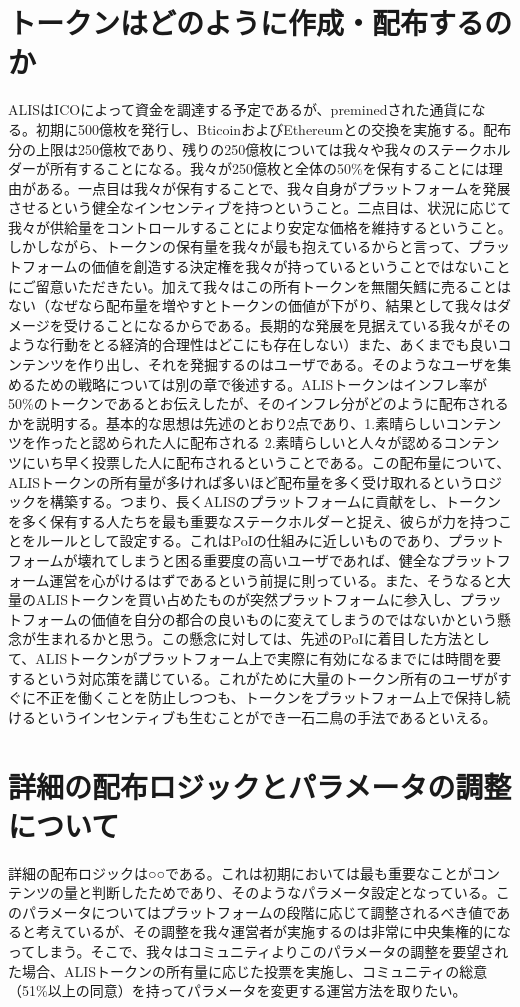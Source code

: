\documentclass{jsarticle}
\begin{document}
\section{トークンはどのように作成・配布するのか}
ALISはICOによって資金を調達する予定であるが、preminedされた通貨になる。初期に500億枚を発行し、BticoinおよびEthereumとの交換を実施する。配布分の上限は250億枚であり、残りの250億枚については我々や我々のステークホルダーが所有することになる。我々が250億枚と全体の50\%を保有することには理由がある。一点目は我々が保有することで、我々自身がプラットフォームを発展させるという健全なインセンティブを持つということ。二点目は、状況に応じて我々が供給量をコントロールすることにより安定な価格を維持するということ。しかしながら、トークンの保有量を我々が最も抱えているからと言って、プラットフォームの価値を創造する決定権を我々が持っているということではないことにご留意いただきたい。加えて我々はこの所有トークンを無闇矢鱈に売ることはない（なぜなら配布量を増やすとトークンの価値が下がり、結果として我々はダメージを受けることになるからである。長期的な発展を見据えている我々がそのような行動をとる経済的合理性はどこにも存在しない）また、あくまでも良いコンテンツを作り出し、それを発掘するのはユーザである。そのようなユーザを集めるための戦略については別の章で後述する。ALISトークンはインフレ率が50\%のトークンであるとお伝えしたが、そのインフレ分がどのように配布されるかを説明する。基本的な思想は先述のとおり2点であり、1.素晴らしいコンテンツを作ったと認められた人に配布される 2.素晴らしいと人々が認めるコンテンツにいち早く投票した人に配布されるということである。この配布量について、ALISトークンの所有量が多ければ多いほど配布量を多く受け取れるというロジックを構築する。つまり、長くALISのプラットフォームに貢献をし、トークンを多く保有する人たちを最も重要なステークホルダーと捉え、彼らが力を持つことをルールとして設定する。これはPoIの仕組みに近しいものであり、プラットフォームが壊れてしまうと困る重要度の高いユーザであれば、健全なプラットフォーム運営を心がけるはずであるという前提に則っている。また、そうなると大量のALISトークンを買い占めたものが突然プラットフォームに参入し、プラットフォームの価値を自分の都合の良いものに変えてしまうのではないかという懸念が生まれるかと思う。この懸念に対しては、先述のPoIに着目した方法として、ALISトークンがプラットフォーム上で実際に有効になるまでには時間を要するという対応策を講じている。これがために大量のトークン所有のユーザがすぐに不正を働くことを防止しつつも、トークンをプラットフォーム上で保持し続けるというインセンティブも生むことができ一石二鳥の手法であるといえる。
\section{詳細の配布ロジックとパラメータの調整について}
詳細の配布ロジックは○○である。これは初期においては最も重要なことがコンテンツの量と判断したためであり、そのようなパラメータ設定となっている。このパラメータについてはプラットフォームの段階に応じて調整されるべき値であると考えているが、その調整を我々運営者が実施するのは非常に中央集権的になってしまう。そこで、我々はコミュニティよりこのパラメータの調整を要望された場合、ALISトークンの所有量に応じた投票を実施し、コミュニティの総意（51\%以上の同意）を持ってパラメータを変更する運営方法を取りたい。
\end{document}
